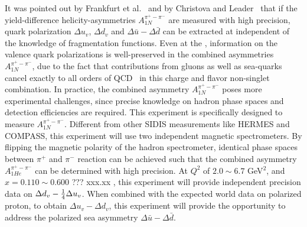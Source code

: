 
 It was  pointed out by Frankfurt et al.~\cite{Frankfurt} and by Christova and Leader~\cite{leader2} that 
if the yield-difference  helicity-asymmetries $A_{1N}^{\pi^+ - \pi^-}$ are measured with  high precision,
quark polarization $\Delta u_v$, $\Delta d_v$ and $\Delta \bar{u} - \Delta \bar{d}$ can be extracted
at \lo independent of the knowledge of fragmentation functions.  Even 
at the \nloo, information on the 
valence quark polarizations is well-preserved in the combined 
asymmetries $A_{1N}^{\pi^+ - \pi^-}$, due to the fact that contributions from 
gluons as well as sea-quarks cancel exactly to all orders of QCD~\cite{leader2} in this charge and flavor 
non-singlet combination.
In practice, the combined asymmetry $A_{1N}^{\pi^+ - \pi^-}$ poses more
experimental challenges, since precise knowledge on hadron phase spaces and detection 
efficiencies are required. This experiment is specifically designed to measure $A_{1N}^{\pi^+ - \pi^-}$.
Different from other SIDIS measurements like HERMES and COMPASS,
this experiment will use two independent magnetic spectrometers. By flipping the magnetic 
polarity of the hadron spectrometer, identical phase spaces between $\pi^+$ and $\pi^-$ 
reaction can be achieved such that the combined asymmetry $A_{1He}^{\pi^+ - \pi^-}$ can be 
determined with high precision.
At $Q^2$ of $2.0\sim 6.7$ GeV$^2$, and $x=0.110 \sim 0.600$ ??? xxx.xx , this experiment will 
provide independent precision data on $\Delta d_v -{1 \over 4} \Delta u_v$.
When combined with the expected world data on polarized proton, 
to obtain $\Delta u_v - \Delta d_v$,
this experiment will provide the
opportunity to address the polarized sea asymmetry $\Delta \bar{u}- \Delta \bar{d}$. 

